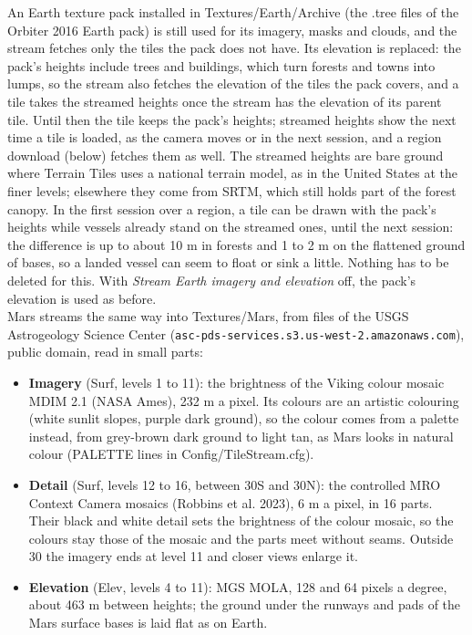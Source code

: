 \documentclass[Orbiter User Manual.tex]{subfiles}
\begin{document}
An Earth texture pack installed in Textures/Earth/Archive (the .tree files of the Orbiter 2016 Earth pack) is still used for its imagery, masks and clouds, and the stream fetches only the tiles the pack does not have. Its elevation is replaced: the pack's heights include trees and buildings, which turn forests and towns into lumps, so the stream also fetches the elevation of the tiles the pack covers, and a tile takes the streamed heights once the stream has the elevation of its parent tile. Until then the tile keeps the pack's heights; streamed heights show the next time a tile is loaded, as the camera moves or in the next session, and a region download (below) fetches them as well. The streamed heights are bare ground where Terrain Tiles uses a national terrain model, as in the United States at the finer levels; elsewhere they come from SRTM, which still holds part of the forest canopy. In the first session over a region, a tile can be drawn with the pack's heights while vessels already stand on the streamed ones, until the next session: the difference is up to about 10 m in forests and 1 to 2 m on the flattened ground of bases, so a landed vessel can seem to float or sink a little. Nothing has to be deleted for this. With \textit{Stream Earth imagery and elevation} off, the pack's elevation is used as before.\\
Mars streams the same way into Textures/Mars, from files of the USGS Astrogeology Science Center (\texttt{asc-pds-services.s3.us-west-2.amazonaws.com}), public domain, read in small parts:
\begin{itemize}
\item \textbf{Imagery} (Surf, levels 1 to 11): the brightness of the Viking colour mosaic MDIM 2.1 (NASA Ames), 232 m a pixel. Its colours are an artistic colouring (white sunlit slopes, purple dark ground), so the colour comes from a palette instead, from grey-brown dark ground to light tan, as Mars looks in natural colour (PALETTE lines in Config/TileStream.cfg).
\item \textbf{Detail} (Surf, levels 12 to 16, between 30\textdegree{}S and 30\textdegree{}N): the controlled MRO Context Camera mosaics (Robbins et al. 2023), 6 m a pixel, in 16 parts. Their black and white detail sets the brightness of the colour mosaic, so the colours stay those of the mosaic and the parts meet without seams. Outside 30\textdegree{} the imagery ends at level 11 and closer views enlarge it.
\item \textbf{Elevation} (Elev, levels 4 to 11): MGS MOLA, 128 and 64 pixels a degree, about 463 m between heights; the ground under the runways and pads of the Mars surface bases is laid flat as on Earth.
\end{itemize}
\end{document}
